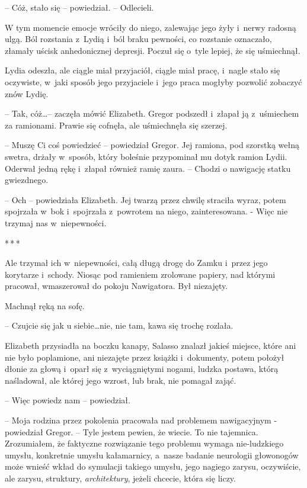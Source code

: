 \documentclass[oneside,polish,12pt,sfheadings]{mwbk}
\newcommand{\threeast}{\bigskip\par\centerline{*\,*\,*}\medskip\par}%
\begin{document}
-- Cóż, stało się -- powiedział. -- Odlecieli.

W tym momencie emocje wróciły do niego, zalewając jego żyły i~nerwy
radosną ulgą. Ból rozstania z~Lydią i~ból braku pewności, co rozstanie
oznaczało, złamały uścisk anhedonicznej depresji. Poczuł się o~tyle
lepiej, że się uśmiechnął.

Lydia odeszła, ale ciągle miał przyjaciół, ciągle miał pracę, i~nagle
stało się oczywiste, w~jaki sposób jego przyjaciele i~jego praca mogłyby
pozwolić zobaczyć znów Lydię.

-- Tak, cóż\ldots -- zaczęła mówić Elizabeth. Gregor podszedł i~złapał ją z~uśmiechem za ramionami. Prawie się cofnęła, ale uśmiechnęła się szerzej.

-- Muszę Ci coś powiedzieć -- powiedział Gregor. Jej ramiona, pod szorstką
wełną swetra, drżały w~sposób, który boleśnie przypominał mu dotyk
ramion Lydii. Oderwał jedną rękę i~złapał również ramię zaura. -- Chodzi
o nawigację statku gwiezdnego.

-- Och -- powiedziała Elizabeth. Jej twarzą przez chwilę straciła wyraz,
potem spojrzała w~bok i~spojrzała z~powrotem na niego, zainteresowana. -
Więc nie trzymaj nas w~niepewności.

\threeast

Ale trzymał ich w~niepewności, całą długą drogę do Zamku i~przez jego
korytarze i~schody. Niosąc pod ramieniem zrolowane papiery, nad którymi
pracował, wmaszerował do pokoju Nawigatora. Był niezajęty.

Machnął ręką na sofę. 

-- Czujcie się jak u siebie\ldots nie, nie tam, kawa
się trochę rozlała.

Elizabeth przysiadła na boczku kanapy, Salasso znalazł jakieś miejsce,
które ani nie było poplamione, ani niezajęte przez książki i~dokumenty,
potem położył dłonie za głową i~oparł się z~wyciągniętymi nogami, ludzka
postawa, którą naśladował, ale której jego wzrost, lub brak, nie pomagał
zająć.

-- Więc powiedz nam -- powiedział.

-- Moja rodzina przez pokolenia pracowała nad problemem nawigacyjnym -
powiedział Gregor. -- Tyle jestem pewien, że wiecie. To nie tajemnica.
Zrozumiałem, że faktyczne rozwiązanie tego problemu wymaga nie-ludzkiego
umysłu, konkretnie umysłu kałamarnicy, a~nasze badanie neurologii
głowonogów może wnieść wkład do symulacji takiego umysłu, jego nagiego
zarysu, oczywiście, ale zarysu, struktury, \emph{architektury}, jeżeli
chcecie, która się liczy.
\end{document}
